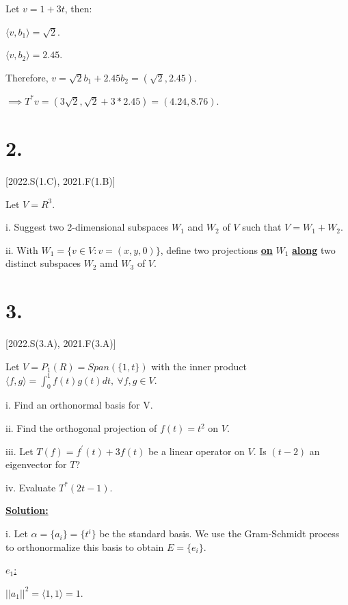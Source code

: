 \documentclass{article}
\begin{document}
Let $v = 1+3t$, then:

\qquad $\langle v, b_1 \rangle = \sqrt{2}$.

\qquad $\langle v, b_2 \rangle = 2.45$.

Therefore, $v = \sqrt{2}b_1 + 2.45b_2 = (\sqrt{2}, 2.45)$.
\newline

$\implies T^*v = (3\sqrt{2}, \sqrt{2} + 3*2.45) = (4.24, 8.76)$.
\newpage


\section*{2.}[2022.S(1.C), 2021.F(1.B)]

Let $V=R^3$.

i. Suggest two 2-dimensional subspaces $W_1$ and $W_2$ of $V$ such that $V=W_1 + W_2$.

ii. With $W_1= \{v \in V: v=(x,y,0) \}$, define two projections \textbf{\underline{on}} $W_1$ \textbf{\underline{along}} two distinct subspaces $W_2$ amd $W_3$ of $V$.

\newpage


\section*{3.}[2022.S(3.A), 2021.F(3.A)]

Let $V = P_1(R) = Span(\{ 1,t \})$ with the inner product $\langle f,g \rangle = \int_{0}^{1} f(t)g(t)dt, \: \forall f,g \in V$.

  i. Find an orthonormal basis for V.
  
  ii. Find the orthogonal projection of $f(t)= t^2$ on $V$.

  iii. Let $T(f) = f^\prime(t) + 3f(t)$ be a linear operator on $V$. Is $(t-2)$ an eigenvector for $T$?

  iv. Evaluate $T^*(2t-1)$.


  \begin{center}
    \textbf{\underline{Solution:}}  
  \end{center}

  i. Let $\alpha = \{ a_i \} = \{ t^i \}$ be the standard basis.
  We use the Gram-Schmidt process to orthonormalize this basis to obtain $E=\{e_i\}$.
  \newline

  \underline{$e_1$:}

  $||a_1||^2 
  = \langle 1, 1\rangle 
  = 1$.
  \newline
\end{document}
